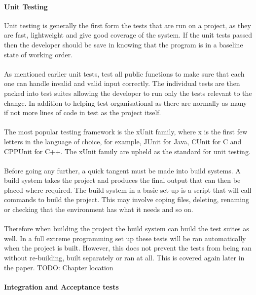 \paragraph{Unit Testing}
Unit testing is generally the first form the tests that are run on a project, as they are fast, lightweight and give good coverage of the system. If the unit tests passed then the developer should be save in knowing that the program is in a baseline state of working order. 
\\\\
As mentioned earlier unit tests, test all public functions to make sure that each one can handle invalid and valid input correctly. The individual tests are then packed into test suites allowing the developer to run only the tests relevant to the change. In addition to helping test organisational as there are normally as many if not more lines of code in test as the project itself.
\\\\
The most popular testing framework is the xUnit family, where x is the first few letters in the language of choice, for example, JUnit for Java, CUnit for C and  CPPUnit for C++. The xUnit family  are upheld as the standard for unit testing.
\\\\
Before going any further, a quick tangent must be made into build systems. A build system takes the project and produces the final output that can then be placed where required. The build system in a basic set-up is a script that will call commands to build the project. This may involve coping files, deleting, renaming or checking that the environment has what it needs and so on.
\\\\
Therefore when building the project the build system can build the test suites as well. In a full extreme programming set up these tests will be ran automatically when the project is built. However, this does not prevent the tests from being ran without re-building, built separately or ran at all. This is covered again later in the paper. TODO: Chapter location

\paragraph{Integration and Acceptance tests}

